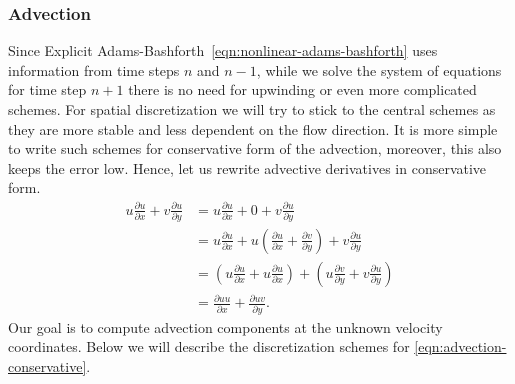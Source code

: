 \documentclass{article}
\begin{document}
\subsubsection{Advection}\label{subsec:advection}

Since Explicit Adams-Bashforth~\cref{eqn:nonlinear-adams-bashforth} uses information from time steps $n$ and $n-1$, while we solve the system of equations for time step $n+1$ there is no need for upwinding or even more complicated schemes. For spatial discretization we will try to stick to the central schemes as they are more stable and less dependent on the flow direction. It is more simple to write such schemes for conservative form of the advection, moreover, this also keeps the error low. Hence, let us rewrite advective derivatives in conservative form. 
\begin{align}\label{eqn:advection-conservative}
	u\frac{\partial u}{\partial x}+v \frac{\partial u}{\partial y}
	&=u\frac{\partial u}{\partial x}+0+v \frac{\partial u}{\partial y}\nonumber\\
	&= u\frac{\partial u}{\partial x}+ u\left(\frac{\partial u}{\partial x} +\frac{\partial v}{\partial y}\right ) +v \frac{\partial u}{\partial y}\nonumber\\
	&=\left(u\frac{\partial u}{\partial x}+ u\frac{\partial u}{\partial x}\right ) +\left(u\frac{\partial v}{\partial y} +v \frac{\partial u}{\partial y}\right )\nonumber\\
	&=\frac{\partial uu}{\partial x}+ \frac{\partial uv}{\partial y}.
\end{align}
Our goal is to compute advection components at the unknown velocity coordinates. Below we will describe the discretization schemes for \cref{eqn:advection-conservative}. 
\end{document}
